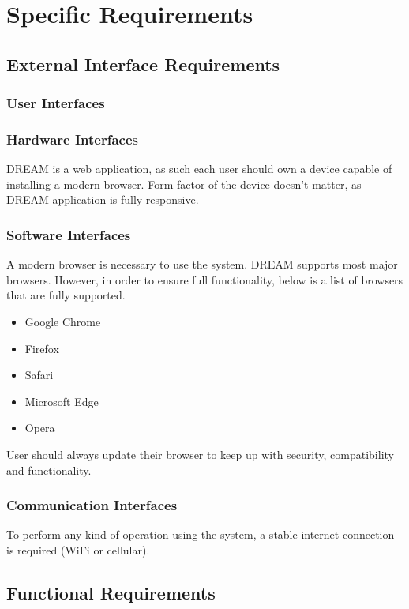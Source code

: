 \chapter{Specific Requirements}

\section{External Interface Requirements}

\subsection{User Interfaces}

\subsection{Hardware Interfaces}
DREAM is a web application, as such each user should own a device capable of installing a modern browser. Form factor of the device doesn't matter, as DREAM application is fully responsive.

\subsection{Software Interfaces}
A modern browser is necessary to use the system. DREAM supports most major browsers. However, in order to ensure full functionality, below is a list of browsers that are fully supported.
\begin{itemize}
    \setlength\itemsep{0em}
    \item Google Chrome
    \item Firefox
    \item Safari
    \item Microsoft Edge
    \item Opera
\end{itemize}
User should always update their browser to keep up with security, compatibility and functionality.

\subsection{Communication Interfaces}
To perform any kind of operation using the system, a stable internet connection is required (WiFi or cellular).

\section{Functional Requirements}

